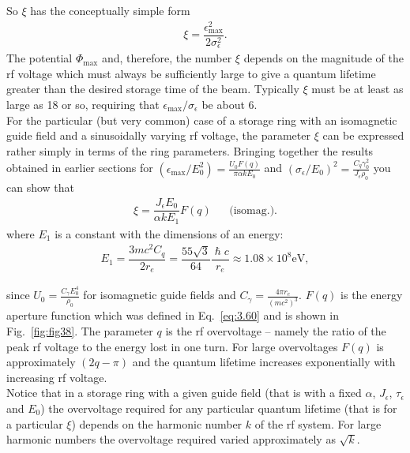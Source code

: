 So $\xi$ has the conceptually simple form
\begin{align}
	\xi = \dfrac{\epsilon_\text{max}^2}{2\sigma_\epsilon^2}.
\end{align}
The potential $\Phi_\text{max}$ and, therefore, the number $\xi$ depends on the magnitude of the rf voltage which must always be sufficiently large to give a quantum lifetime greater than the desired storage time of the beam. Typically $\xi$ must be at least as large as 18 or so, requiring that $\epsilon_\text{max}/\sigma_\epsilon$ be about 6.\\
For the particular (but very common) case of a storage ring with an isomagnetic guide field and a sinusoidally varying rf voltage, the parameter $\xi$ can be expressed rather simply in terms of the ring parameters. Bringing together the results obtained in earlier sections for $(\epsilon_\text{max}/E_0^2) = \frac{U_0 F(q)}{\pi \alpha k E_0}$ and $(\sigma_\epsilon/E_0)^2 = \frac{C_q\gamma_0^2}{J_\epsilon \rho_0}$ you can show that
\begin{align}
	\xi = \dfrac{J_\epsilon E_0}{\alpha k E_1} F(q) && \text{(isomag.)}.
\end{align}
where $E_1$ is a constant with the dimensions of an energy:
\begin{align}
	E_1 = \dfrac{3mc^2 C_q}{2 r_e} = \dfrac{55 \sqrt{3}}{64} \dfrac{\hslash c}{r_e} \approx 1.08 \times 10^8 \text{eV},
\end{align}

since $U_0 = \frac{C_\gamma E_0^4}{\rho_0}$ for isomagnetic guide fields and $C_\gamma = \frac{4\pi r_e}{(mc^2)^3}$. $F(q)$ is the energy aperture function which was defined in Eq.~\eqref{eq:3.60} and is shown in Fig.~\ref{fig:fig38}. The parameter $q$ is the rf overvoltage -- namely the ratio of the peak rf voltage to the energy lost in one turn. For large overvoltages $F(q)$ is approximately $(2q- \pi)$ and the quantum lifetime increases exponentially with increasing rf voltage.\\
Notice that in a storage ring with a given guide field (that is with a fixed $\alpha$,
$J_\epsilon$, $\tau_\epsilon$ and $E_0$) the overvoltage required for any particular quantum lifetime (that is for a particular $\xi$) depends on the harmonic number $k$ of the rf system. For large harmonic numbers the overvoltage required varied approximately as $\sqrt{k}$.
